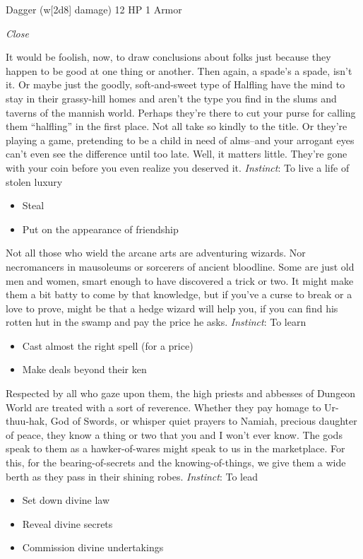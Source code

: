 \HRule
{}

Dagger (w[2d8] damage)\hspace*{\fill} 12 HP 1 Armor

\emph{Close}

\HRule
It would be foolish, now, to draw conclusions about folks just because they happen to be good at one thing or another. Then again, a spade's a spade, isn't it. Or maybe just the goodly, soft-and-sweet type of Halfling have the mind to stay in their grassy-hill homes and aren't the type you find in the slums and taverns of the mannish world. Perhaps they're there to cut your purse for calling them ``halfling'' in the first place. Not all take so kindly to the title. Or they're playing a game, pretending to be a child in need of alms--and your arrogant eyes can't even see the difference until too late. Well, it matters little. They're gone with your coin before you even realize you deserved it. \emph{Instinct}: To live a life of stolen luxury
\begin{itemize}
\item Steal
\item Put on the appearance of friendship
\end{itemize}

\HRule
{}

\HRule
Not all those who wield the arcane arts are adventuring wizards. Nor necromancers in mausoleums or sorcerers of ancient bloodline. Some are just old men and women, smart enough to have discovered a trick or two. It might make them a bit batty to come by that knowledge, but if you've a curse to break or a love to prove, might be that a hedge wizard will help you, if you can find his rotten hut in the swamp and pay the price he asks. \emph{Instinct}: To learn
\begin{itemize}
\item Cast almost the right spell (for a price)
\item Make deals beyond their ken
\end{itemize}

\HRule
{}

\HRule
Respected by all who gaze upon them, the high priests and abbesses of Dungeon World are treated with a sort of reverence. Whether they pay homage to Ur-thuu-hak, God of Swords, or whisper quiet prayers to Namiah, precious daughter of peace, they know a thing or two that you and I won't ever know. The gods speak to them as a hawker-of-wares might speak to us in the marketplace. For this, for the bearing-of-secrets and the knowing-of-things, we give them a wide berth as they pass in their shining robes. \emph{Instinct}: To lead
\begin{itemize}
\item Set down divine law
\item Reveal divine secrets
\item Commission divine undertakings
\end{itemize}
\newpage
\HRule
{}

